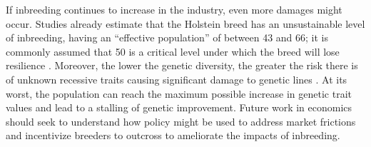 \documentclass[12pt,letterpaper]{article}
\begin{document}





If inbreeding continues to increase in the industry, even more damages might occur.
Studies already estimate that the Holstein breed has an unsustainable level of inbreeding, having an ``effective population'' of between 43 and 66; it is commonly assumed that 50 is a critical level under which the breed will lose resilience \citep{Makanjuola2020}.
Moreover, the lower the genetic diversity, the greater the risk there is of unknown recessive traits causing significant damage to genetic lines \citep{Cole2011, Lozada2024}. 
At its worst, the population can reach the maximum possible increase in genetic trait values and lead to a stalling of genetic improvement.
Future work in economics should seek to understand how policy might be used to address market frictions and incentivize breeders to outcross to ameliorate the impacts of inbreeding.
\end{document}
